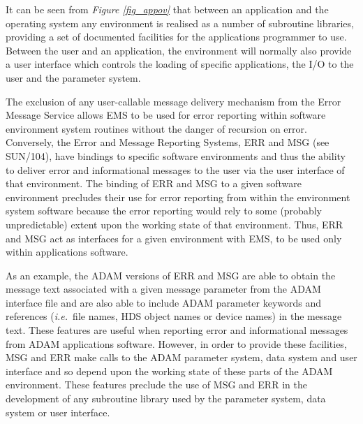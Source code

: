 \documentclass[twoside,11pt]{article}
\newcommand{\latex}[1]{#1}
\newcommand{\xref}[3]{#1}
\renewcommand{\_}{\texttt{\symbol{95}}}
\begin{document}
It can be seen from \textit{Figure \ref{fig_appov}} that between an application
and the
operating system any environment is realised as a number of subroutine
libraries, providing a set of documented facilities for the applications
programmer to use.
Between the user and an application, the environment will normally also 
provide a user interface which controls the loading of specific applications,
the I/O to the user and the parameter system.

The exclusion of any user-callable message delivery mechanism from the Error
Message Service allows EMS to be used for error reporting within software
environment system routines without the danger of recursion on error.
Conversely, the Error and Message Reporting Systems, 
\xref{ERR and MSG}{sun104}{}\latex{ (see SUN/104)}, 
have bindings to specific software environments and thus the ability to 
deliver error and informational messages to the user via the user interface 
of that environment.
The binding of ERR and MSG to a given software environment precludes their use
for error reporting from within the environment system software because the
error reporting would rely to some (probably unpredictable) extent upon the 
working state of that environment.
Thus, ERR and MSG act as interfaces for a given environment with EMS, to be 
used only within applications software.

As an example, the 
\xref{ADAM}{sg4}{}
versions of ERR and MSG are able to obtain the message text associated with a 
given message parameter from the ADAM interface file and are also able to 
include ADAM parameter keywords and references (\textit{i.e.}\ file names, 
\xref{HDS}{sun92}{}
object names or device names) in the message text.
These features are useful when reporting error and informational messages 
from ADAM applications software. 
However, in order to provide these facilities, MSG and ERR make calls to the
ADAM parameter system, data system and user interface and so depend
upon the working state of these parts of the ADAM environment.
These features preclude the use of MSG and ERR in the development of any 
subroutine library used by the parameter system, data system or user interface.

\newpage
\end{document}
